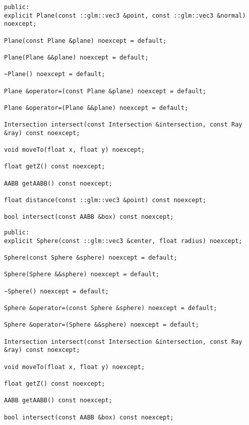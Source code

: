 \begin{lstlisting}[caption={Plane API}, captionpos=b, label=API_Plane]
public:
explicit Plane(const ::glm::vec3 &point, const ::glm::vec3 &normal) noexcept;

Plane(const Plane &plane) noexcept = default;

Plane(Plane &&plane) noexcept = default;

~Plane() noexcept = default;

Plane &operator=(const Plane &plane) noexcept = default;

Plane &operator=(Plane &&plane) noexcept = default;

Intersection intersect(const Intersection &intersection, const Ray &ray) const noexcept;

void moveTo(float x, float y) noexcept;

float getZ() const noexcept;

AABB getAABB() const noexcept;

float distance(const ::glm::vec3 &point) const noexcept;

bool intersect(const AABB &box) const noexcept;
\end{lstlisting}

\begin{lstlisting}[caption={Sphere API}, captionpos=b, label=API_Sphere]
public:
explicit Sphere(const ::glm::vec3 &center, float radius) noexcept;

Sphere(const Sphere &sphere) noexcept = default;

Sphere(Sphere &&sphere) noexcept = default;

~Sphere() noexcept = default;

Sphere &operator=(const Sphere &sphere) noexcept = default;

Sphere &operator=(Sphere &&sphere) noexcept = default;

Intersection intersect(const Intersection &intersection, const Ray &ray) const noexcept;

void moveTo(float x, float y) noexcept;

float getZ() const noexcept;

AABB getAABB() const noexcept;

bool intersect(const AABB &box) const noexcept;
\end{lstlisting}


